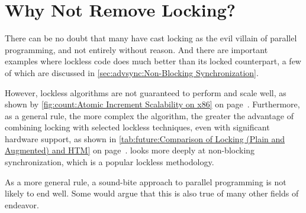 
\section{Why Not Remove Locking?}
\label{sec:app:questions:Why Not Remove Locking?}

There can be no doubt that many have cast locking as the evil villain
of parallel programming, and not entirely without reason.
And there are important examples where lockless code does much better
than its locked counterpart, a few of which are discussed in
\cref{sec:advsync:Non-Blocking Synchronization}.

However, lockless algorithms are not guaranteed to perform and scale
well, as shown by
\cref{fig:count:Atomic Increment Scalability on x86} on
page~\pageref{fig:count:Atomic Increment Scalability on x86}.
Furthermore, as a general rule, the more complex the algorithm,
the greater the advantage of combining locking with selected
lockless techniques, even with significant hardware support,
as shown in
\cref{tab:future:Comparison of Locking (Plain and Augmented) and HTM}
on
page~\pageref{tab:future:Comparison of Locking (Plain and Augmented) and HTM}.
looks more deeply at non-blocking synchronization, which is a popular
lockless methodology.

As a more general rule, a sound-bite approach to parallel programming
is not likely to end well.
Some would argue that this is also true of many other fields of endeavor.

